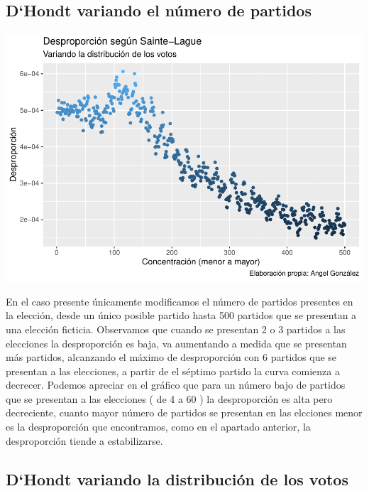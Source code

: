 \documentclass[12pt,a4paper,]{book}
\numberwithin{dummy}{section}
\theoremstyle{ocrenumbox}
\theoremstyle{blacknumex}
\theoremstyle{blacknumbox}
\theoremstyle{ocrenum}
\theoremstyle{ocrenum}
\begin{document}
\hypertarget{dhondt-variando-el-nuxfamero-de-partidos}{%
\subsection{D`Hondt variando el número de
partidos}\label{dhondt-variando-el-nuxfamero-de-partidos}}

\begin{center}\includegraphics[width=0.95\linewidth]{figurasR/unnamed-chunk-13-1} \end{center}

En el caso presente únicamente modificamos el número de partidos
presentes en la elección, desde un único posible partido hasta 500
partidos que se presentan a una elección ficticia. Observamos que cuando
se presentan 2 o 3 partidos a las elecciones la desproporción es baja,
va aumentando a medida que se presentan más partidos, alcanzando el
máximo de desproporción con 6 partidos que se presentan a las
elecciones, a partir de el séptimo partido la curva comienza a decrecer.
Podemos apreciar en el gráfico que para un número bajo de partidos que
se presentan a las elecciones ( de 4 a 60 ) la desproporción es alta
pero decreciente, cuanto mayor número de partidos se presentan en las
elcciones menor es la desproporción que encontramos, como en el apartado
anterior, la desproporción tiende a estabilizarse.

\hypertarget{dhondt-variando-la-distribuciuxf3n-de-los-votos}{%
\subsection{D`Hondt variando la distribución de los
votos}\label{dhondt-variando-la-distribuciuxf3n-de-los-votos}}
\end{document}
